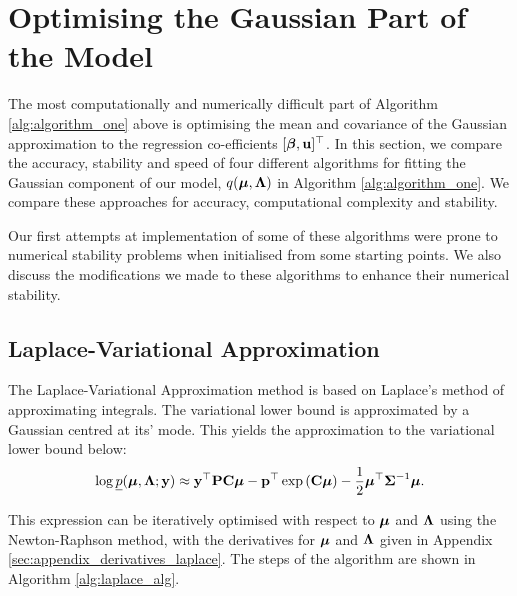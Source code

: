 \section{Optimising the Gaussian Part of the Model}
	\label{sec:gaussian}

	The most computationally and numerically difficult part of Algorithm \ref{alg:algorithm_one} above is
	optimising the mean and covariance of the Gaussian approximation to the regression co-efficients $[{\boldsymbol \beta},
	{\bf u}]^\top$. In this section, we compare the accuracy, stability and speed of four different algorithms for
	fitting the Gaussian component of our model, $q({\boldsymbol \mu}, {\boldsymbol \Lambda})$ in Algorithm \ref{alg:algorithm_one}.  We
	compare these approaches for accuracy, computational complexity and stability.

	Our first attempts at implementation of some of these algorithms were prone to numerical stability problems
	when initialised from some starting points. We also discuss the modifications we made to these algorithms to
	enhance their numerical stability.
		
	\subsection{Laplace-Variational Approximation}
	The Laplace-Variational Approximation method is based on Laplace's method of approximating integrals.
	The variational lower bound  is approximated by a Gaussian centred at its' mode.
	This yields the approximation to the variational lower bound below:
	\begin{align*}
		\log \underline{p}({\boldsymbol \mu}, {\boldsymbol \Lambda}; {\bf y}) \approx {\bf y}^\top{\bf P}{\bf C}{\boldsymbol\mu} - {\bf p}^\top\exp \left ({\bf C} {\boldsymbol \mu} \right ) - \frac{1}{2} {\boldsymbol \mu}^\top {\boldsymbol\Sigma}^{-1} {\boldsymbol \mu}. 
	\end{align*}
			
	\noindent This expression can be iteratively optimised with respect to ${\boldsymbol \mu}$ and ${\boldsymbol \Lambda}$ using the
	Newton-Raphson method, with the derivatives for ${\boldsymbol \mu}$ and ${\boldsymbol \Lambda}$ given in Appendix
	\ref{sec:appendix_derivatives_laplace}. The steps of the algorithm are shown in Algorithm \ref{alg:laplace_alg}.
			
